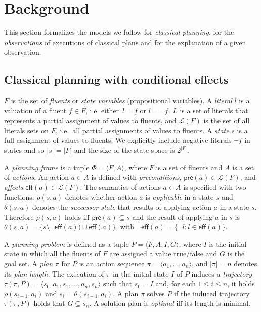 \documentclass[runningheads]{llncs}
\newcommand{\tup}[1]{{\langle #1 \rangle}}
\newcommand{\pre}{\mathsf{pre}}     %
\newcommand{\eff}{\mathsf{eff}}     %
\begin{document}
\section{Background}
This section formalizes the models we follow for {\em classical planning}, for the {\em observations} of executions of classical plans and for the explanation of a given observation.

\subsection{Classical planning with conditional effects}
$F$ is the set of {\em fluents} or {\em state variables} (propositional variables). A {\em literal} $l$ is a valuation of a fluent $f\in F$, i.e. either~$l=f$ or $l=\neg f$. $L$ is a set of literals that represents a partial assignment of values to fluents, and $\mathcal{L}(F)$ is the set of all literals sets on $F$, i.e.~all partial assignments of values to fluents. A {\em state} $s$ is a full assignment of values to fluents. We explicitly include negative literals $\neg f$ in states and so $|s|=|F|$ and the size of the state space is $2^{|F|}$.

A {\em planning frame} is a tuple $\Phi=\tup{F,A}$, where $F$ is a set of fluents and $A$ is a set of \emph{actions}. An action $a\in A$ is defined with {\em preconditions}, $\pre(a)\in\mathcal{L}(F)$,  and {\em effects} $\eff(a)\in\mathcal{L}(F)$. The semantics of actions $a\in A$ is specified with two functions: $\rho(s,a)$ denotes whether action $a$ is {\em applicable} in a state $s$ and $\theta(s,a)$ denotes the {\em successor state} that results of applying action $a$ in a state $s$. Therefore $\rho(s,a)$ holds iff $\pre(a)\subseteq s$ and the result of applying $a$ in $s$ is $\theta(s,a)=\{s\setminus\neg\eff(a))\cup\eff(a)\}$, with $\neg\eff(a) = \{\neg l : l \in \eff(a)\}$.

A {\em planning problem} is defined as a tuple $P=\tup{F,A,I,G}$, where $I$ is the initial state in which all the fluents of $F$ are assigned a value true/false and $G$ is the goal set. A {\em plan} $\pi$ for $P$ is an action sequence $\pi=\tup{a_1, \ldots, a_n}$, and $|\pi|=n$ denotes its {\em plan length}. The execution of $\pi$ in the initial state $I$ of $P$ induces a {\em trajectory} $\tau(\pi,P)=\tup{s_0, a_1, s_1, \ldots, a_n, s_n}$ such that $s_0=I$ and, for each {\small $1\leq i\leq n$}, it holds $\rho(s_{i-1},a_i)$ and $s_i=\theta(s_{i-1},a_i)$. A plan $\pi$ solves $P$ if the induced trajectory $\tau(\pi,P)$ holds that $G \subseteq s_n$. A solution plan is {\em optimal} iff its length is minimal.
\end{document}
